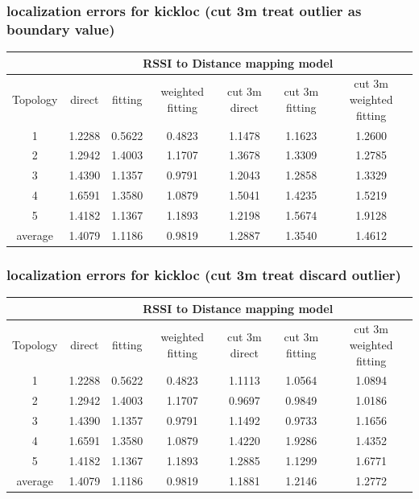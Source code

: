 \documentclass[11pt]{beamer}
\begin{document}
\begin{frame}
\frametitle{localization errors for kickloc (cut 3m treat outlier as boundary value)}
\tiny
\begin{tabular}{|c|c|c|c|c|c|c|}
\hline 
 & \multicolumn{6}{c|}{RSSI to Distance mapping model} \\ 
\hline 
Topology & direct  & fitting & weighted fitting & cut 3m direct & cut 3m fitting & cut 3m weighted fitting \\ 
\hline 
1 & 1.2288 & 0.5622 & 0.4823 & 1.1478 & 1.1623 & 1.2600 \\ 
\hline 
2 & 1.2942 & 1.4003 & 1.1707 & 1.3678 & 1.3309 & 1.2785 \\ 
\hline 
3 & 1.4390 & 1.1357 & 0.9791 & 1.2043 & 1.2858 & 1.3329 \\ 
\hline 
4 & 1.6591 & 1.3580 & 1.0879 & 1.5041 & 1.4235 & 1.5219 \\ 
\hline 
5 & 1.4182 & 1.1367 & 1.1893 & 1.2198 & 1.5674 & 1.9128 \\ 
\hline 
average & 1.4079 & 1.1186 & 0.9819 & 1.2887 & 1.3540 & 1.4612 \\ 
\hline 
\end{tabular} 
\end{frame}

\begin{frame}
\frametitle{localization errors for kickloc (cut 3m treat discard outlier)}
\tiny
\begin{tabular}{|c|c|c|c|c|c|c|}
\hline 
 & \multicolumn{6}{c|}{RSSI to Distance mapping model} \\ 
\hline 
Topology & direct  & fitting & weighted fitting & cut 3m direct & cut 3m fitting & cut 3m weighted fitting \\ 
\hline 
1 & 1.2288 & 0.5622 & 0.4823 & 1.1113 & 1.0564 & 1.0894 \\ 
\hline 
2 & 1.2942 & 1.4003 & 1.1707 & 0.9697 & 0.9849 & 1.0186 \\ 
\hline 
3 & 1.4390 & 1.1357 & 0.9791 & 1.1492 & 0.9733 & 1.1656 \\ 
\hline 
4 & 1.6591 & 1.3580 & 1.0879 & 1.4220 & 1.9286 & 1.4352 \\ 
\hline 
5 & 1.4182 & 1.1367 & 1.1893 & 1.2885 & 1.1299 & 1.6771 \\ 
\hline 
average & 1.4079 & 1.1186 & 0.9819 & 1.1881 & 1.2146 & 1.2772 \\ 
\hline 
\end{tabular} 
\end{frame}
\end{document}
